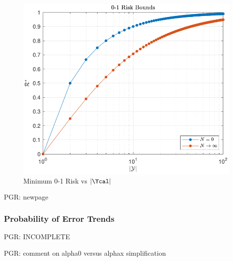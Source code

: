 \documentclass[12pt]{report}
\begin{document}
\begin{figure}
\centering
\includegraphics[width=0.7\linewidth]{Risk_01_uni_N_bounds.pdf}
\caption{Minimum 0-1 Risk vs $|\Ycal|$}
\label{fig:Risk_01_uni_N_bounds}
\end{figure}




\newpage
PGR: newpage

\subsubsection{Probability of Error Trends}

PGR: INCOMPLETE

PGR: comment on alpha0 versus alphax simplification
\end{document}
